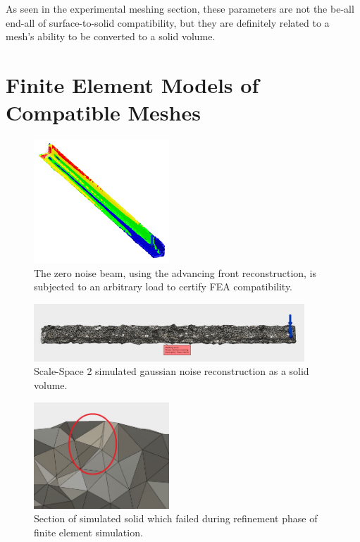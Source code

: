 \documentclass[12pt]{drexelthesis}
\let\Oldsection\section
\renewcommand{\section}{\FloatBarrier\Oldsection}
\begin{document}
As seen in the experimental meshing section, these parameters are not the be-all end-all of surface-to-solid compatibility, but they are definitely related to a mesh's ability to be converted to a solid volume.

\section{Finite Element Models of Compatible Meshes}



\begin{figure}[!ht]
	\centering
		\includegraphics[width=2in]{conclusion/advancedfrontloading.png}
		\caption[FEA loading results on the zero noise beam]{\centering The zero noise beam, using the advancing front reconstruction, is subjected to an arbitrary load to certify FEA compatibility.}
	\label{conc:zeronoiseload}
\end{figure} 

\begin{figure}[!ht]
	\centering
		\includegraphics[width=4in]{conclusion/noiseSS2Bounded.jpg}
		\caption[Optimized gaussian noise reconstruction as a solid volume]{\centering Scale-Space 2 simulated gaussian noise reconstruction as a solid volume.}
	\label{conc:gnoisesolid}
\end{figure}


\begin{figure}[!ht]
	\centering
		\includegraphics[width=2in]{conclusion/noiseSS2BoundedProblem.jpg}
		\caption[Failure section of noise induced solid volume]{\centering Section of simulated solid which failed during refinement phase of finite element simulation.}
	\label{conc:gnoiseproblem}
\end{figure}
\end{document}

